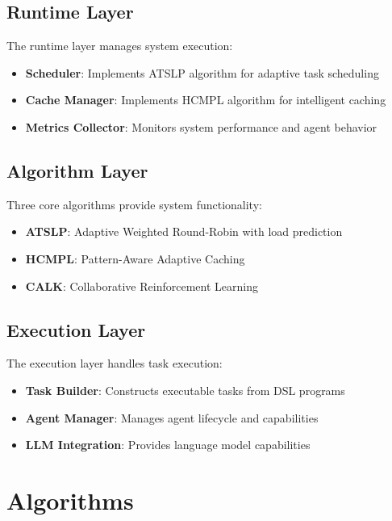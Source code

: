 \documentclass[conference]{IEEEtran}
\begin{document}
\subsection{Runtime Layer}

The runtime layer manages system execution:

\begin{itemize}
\item \textbf{Scheduler}: Implements ATSLP algorithm for adaptive task scheduling
\item \textbf{Cache Manager}: Implements HCMPL algorithm for intelligent caching
\item \textbf{Metrics Collector}: Monitors system performance and agent behavior
\end{itemize}

\subsection{Algorithm Layer}

Three core algorithms provide system functionality:

\begin{itemize}
\item \textbf{ATSLP}: Adaptive Weighted Round-Robin with load prediction
\item \textbf{HCMPL}: Pattern-Aware Adaptive Caching
\item \textbf{CALK}: Collaborative Reinforcement Learning
\end{itemize}

\subsection{Execution Layer}

The execution layer handles task execution:

\begin{itemize}
\item \textbf{Task Builder}: Constructs executable tasks from DSL programs
\item \textbf{Agent Manager}: Manages agent lifecycle and capabilities
\item \textbf{LLM Integration}: Provides language model capabilities
\end{itemize}

\section{Algorithms}
\end{document}

